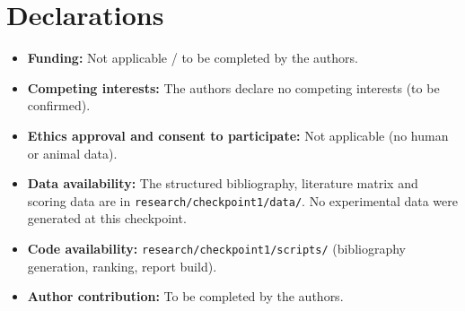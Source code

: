 \documentclass[pdflatex,sn-mathphys-num]{sn-jnl}
\begin{document}
\section*{Declarations}
\begin{itemize}
\item \textbf{Funding:} Not applicable / to be completed by the authors.
\item \textbf{Competing interests:} The authors declare no competing interests (to be confirmed).
\item \textbf{Ethics approval and consent to participate:} Not applicable (no human or animal data).
\item \textbf{Data availability:} The structured bibliography, literature matrix and scoring data are in
  \texttt{research/checkpoint1/data/}. No experimental data were generated at this checkpoint.
\item \textbf{Code availability:} \texttt{research/checkpoint1/scripts/} (bibliography generation, ranking,
  report build).
\item \textbf{Author contribution:} To be completed by the authors.
\end{itemize}


\end{document}
